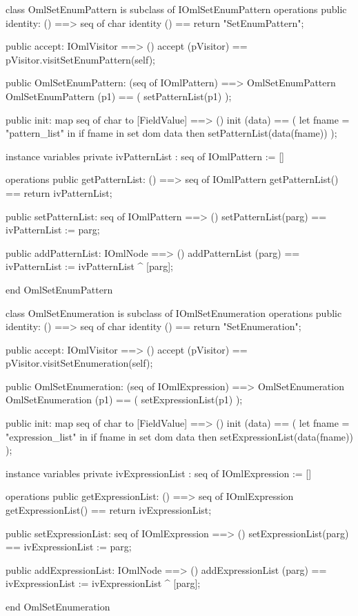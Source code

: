 \begin{vdm_al}
class OmlSetEnumPattern is subclass of IOmlSetEnumPattern
operations
  public identity: () ==> seq of char
  identity () == return "SetEnumPattern";

  public accept: IOmlVisitor ==> ()
  accept (pVisitor) == pVisitor.visitSetEnumPattern(self);

  public OmlSetEnumPattern:
      (seq of IOmlPattern) ==> OmlSetEnumPattern
  OmlSetEnumPattern (p1) == 
   ( setPatternList(p1) );

  public init: map seq of char to [FieldValue] ==> ()
  init (data) ==
    ( let fname = "pattern_list" in
        if fname in set dom data
        then setPatternList(data(fname)) );

instance variables
  private ivPatternList : seq of IOmlPattern := []

operations
  public getPatternList: () ==> seq of IOmlPattern
  getPatternList() == return ivPatternList;

  public setPatternList: seq of IOmlPattern ==> ()
  setPatternList(parg) == ivPatternList := parg;

  public addPatternList: IOmlNode ==> ()
  addPatternList (parg) == ivPatternList := ivPatternList ^ [parg];

end OmlSetEnumPattern
\end{vdm_al}

\begin{vdm_al}
class OmlSetEnumeration is subclass of IOmlSetEnumeration
operations
  public identity: () ==> seq of char
  identity () == return "SetEnumeration";

  public accept: IOmlVisitor ==> ()
  accept (pVisitor) == pVisitor.visitSetEnumeration(self);

  public OmlSetEnumeration:
      (seq of IOmlExpression) ==> OmlSetEnumeration
  OmlSetEnumeration (p1) == 
   ( setExpressionList(p1) );

  public init: map seq of char to [FieldValue] ==> ()
  init (data) ==
    ( let fname = "expression_list" in
        if fname in set dom data
        then setExpressionList(data(fname)) );

instance variables
  private ivExpressionList : seq of IOmlExpression := []

operations
  public getExpressionList: () ==> seq of IOmlExpression
  getExpressionList() == return ivExpressionList;

  public setExpressionList: seq of IOmlExpression ==> ()
  setExpressionList(parg) == ivExpressionList := parg;

  public addExpressionList: IOmlNode ==> ()
  addExpressionList (parg) == ivExpressionList := ivExpressionList ^ [parg];

end OmlSetEnumeration
\end{vdm_al}

